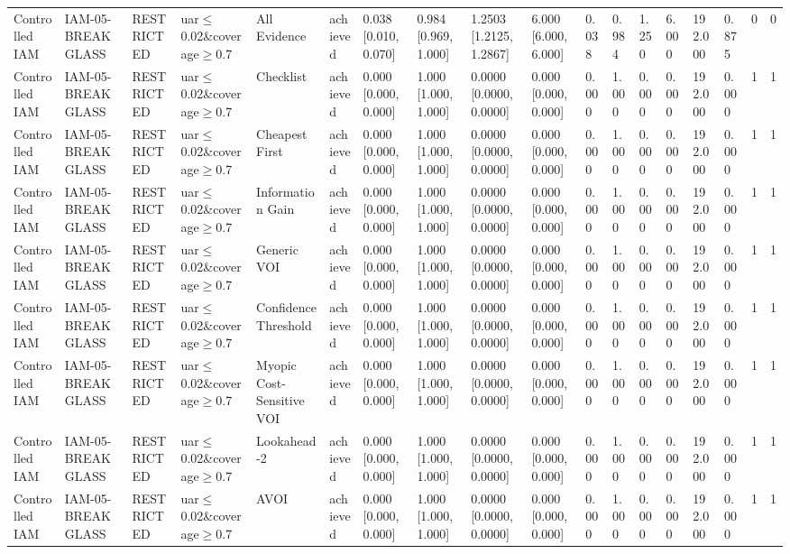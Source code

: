 \begin{table}[!ht]
{\begin{tabular}{llllllllllllllllll}
Controlled IAM & IAM-05-BREAKGLASS & RESTRICTED & uar$\le$0.02\&coverage$\ge$0.7 & All Evidence & achieved & 0.038 [0.010, 0.070] & 0.984 [0.969, 1.000] & 1.2503 [1.2125, 1.2867] & 6.000 [6.000, 6.000] & 0.038 & 0.984 & 1.250 & 6.000 & 192.000 & 0.875 & 0 & 0 \\
Controlled IAM & IAM-05-BREAKGLASS & RESTRICTED & uar$\le$0.02\&coverage$\ge$0.7 & Checklist & achieved & 0.000 [0.000, 0.000] & 1.000 [1.000, 1.000] & 0.0000 [0.0000, 0.0000] & 0.000 [0.000, 0.000] & 0.000 & 1.000 & 0.000 & 0.000 & 192.000 & 0.000 & 1 & 1 \\
Controlled IAM & IAM-05-BREAKGLASS & RESTRICTED & uar$\le$0.02\&coverage$\ge$0.7 & Cheapest First & achieved & 0.000 [0.000, 0.000] & 1.000 [1.000, 1.000] & 0.0000 [0.0000, 0.0000] & 0.000 [0.000, 0.000] & 0.000 & 1.000 & 0.000 & 0.000 & 192.000 & 0.000 & 1 & 1 \\
Controlled IAM & IAM-05-BREAKGLASS & RESTRICTED & uar$\le$0.02\&coverage$\ge$0.7 & Information Gain & achieved & 0.000 [0.000, 0.000] & 1.000 [1.000, 1.000] & 0.0000 [0.0000, 0.0000] & 0.000 [0.000, 0.000] & 0.000 & 1.000 & 0.000 & 0.000 & 192.000 & 0.000 & 1 & 1 \\
Controlled IAM & IAM-05-BREAKGLASS & RESTRICTED & uar$\le$0.02\&coverage$\ge$0.7 & Generic VOI & achieved & 0.000 [0.000, 0.000] & 1.000 [1.000, 1.000] & 0.0000 [0.0000, 0.0000] & 0.000 [0.000, 0.000] & 0.000 & 1.000 & 0.000 & 0.000 & 192.000 & 0.000 & 1 & 1 \\
Controlled IAM & IAM-05-BREAKGLASS & RESTRICTED & uar$\le$0.02\&coverage$\ge$0.7 & Confidence Threshold & achieved & 0.000 [0.000, 0.000] & 1.000 [1.000, 1.000] & 0.0000 [0.0000, 0.0000] & 0.000 [0.000, 0.000] & 0.000 & 1.000 & 0.000 & 0.000 & 192.000 & 0.000 & 1 & 1 \\
Controlled IAM & IAM-05-BREAKGLASS & RESTRICTED & uar$\le$0.02\&coverage$\ge$0.7 & Myopic Cost-Sensitive VOI & achieved & 0.000 [0.000, 0.000] & 1.000 [1.000, 1.000] & 0.0000 [0.0000, 0.0000] & 0.000 [0.000, 0.000] & 0.000 & 1.000 & 0.000 & 0.000 & 192.000 & 0.000 & 1 & 1 \\
Controlled IAM & IAM-05-BREAKGLASS & RESTRICTED & uar$\le$0.02\&coverage$\ge$0.7 & Lookahead-2 & achieved & 0.000 [0.000, 0.000] & 1.000 [1.000, 1.000] & 0.0000 [0.0000, 0.0000] & 0.000 [0.000, 0.000] & 0.000 & 1.000 & 0.000 & 0.000 & 192.000 & 0.000 & 1 & 1 \\
Controlled IAM & IAM-05-BREAKGLASS & RESTRICTED & uar$\le$0.02\&coverage$\ge$0.7 & AVOI & achieved & 0.000 [0.000, 0.000] & 1.000 [1.000, 1.000] & 0.0000 [0.0000, 0.0000] & 0.000 [0.000, 0.000] & 0.000 & 1.000 & 0.000 & 0.000 & 192.000 & 0.000 & 1 & 1 \\

\end{tabular}}
\end{table}
